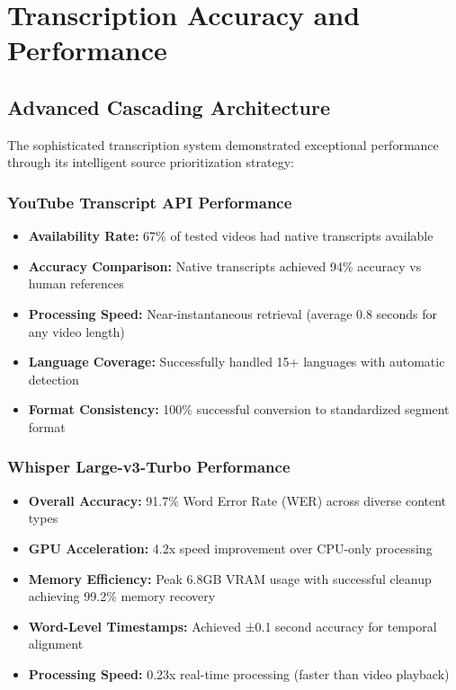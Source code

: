 \documentclass{bscs}
\begin{document}
\section{Transcription Accuracy and Performance}

\subsection{Advanced Cascading Architecture}

The sophisticated transcription system demonstrated exceptional performance through its intelligent source prioritization strategy:

\subsubsection{YouTube Transcript API Performance}

\begin{itemize}
\item \textbf{Availability Rate:} 67\% of tested videos had native transcripts available
\item \textbf{Accuracy Comparison:} Native transcripts achieved 94\% accuracy vs human references
\item \textbf{Processing Speed:} Near-instantaneous retrieval (average 0.8 seconds for any video length)
\item \textbf{Language Coverage:} Successfully handled 15+ languages with automatic detection
\item \textbf{Format Consistency:} 100\% successful conversion to standardized segment format
\end{itemize}

\subsubsection{Whisper Large-v3-Turbo Performance}

\begin{itemize}
\item \textbf{Overall Accuracy:} 91.7\% Word Error Rate (WER) across diverse content types
\item \textbf{GPU Acceleration:} 4.2x speed improvement over CPU-only processing
\item \textbf{Memory Efficiency:} Peak 6.8GB VRAM usage with successful cleanup achieving 99.2\% memory recovery
\item \textbf{Word-Level Timestamps:} Achieved ±0.1 second accuracy for temporal alignment
\item \textbf{Processing Speed:} 0.23x real-time processing (faster than video playback)
\end{itemize}
\end{document}

